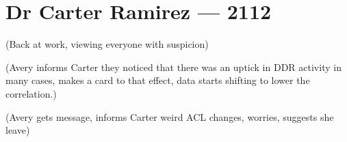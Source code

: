 \hypertarget{dr-carter-ramirez-2112}{%
\chapter*{Dr Carter Ramirez — 2112}\label{dr-carter-ramirez-2112}}

(Back at work, viewing everyone with suspicion)

(Avery informs Carter they noticed that there was an uptick in DDR activity in many cases, makes a card to that effect, data starts shifting to lower the correlation.)

(Avery gets message, informs Carter weird ACL changes, worries, suggests she leave)
